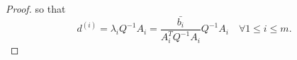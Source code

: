 \begin{proof}
so that 
\[
d^{(i)} = \lambda_i Q^{-1}A_i = \frac {\bar{b_i}}{A_i^T  Q^{-1}A_i}  Q^{-1}A_i \quad \forall 1\le i\le m.
\]


\end{proof}
